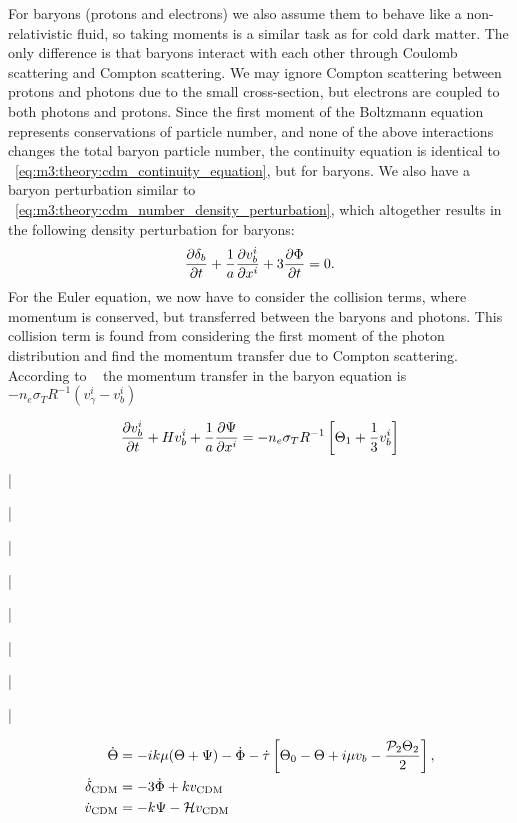     For baryons (protons and electrons) we also assume them to behave like a non-relativistic fluid, so taking moments is a similar task as for cold dark matter. The only difference is that baryons interact with each other through Coulomb scattering and Compton scattering. We may ignore Compton scattering between protons and photons due to the small cross-section, but electrons are coupled to both photons and protons. Since the first moment of the Boltzmann equation represents conservations of particle number, and none of the above interactions changes the total baryon particle number, the continuity equation is identical to ~\cref{eq:m3:theory:cdm_continuity_equation}, but for baryons. We also have a baryon perturbation similar to ~\cref{eq:m3:theory:cdm_number_density_perturbation}, which altogether results in the following density perturbation for baryons:
    \begin{equation}\label{eq:m3:theory:baryon_density_perturbation}
        \pdv{\delta_b}{t}+\frac{1}{a}\pdv{v_b^i}{x^i} + 3\pdv{\Phi}{t} = 0.
    \end{equation}
    For the Euler equation, we now have to consider the collision terms, where momentum is conserved, but transferred between the baryons and photons. This collision term is found from considering the first moment of the photon distribution and find the momentum transfer due to Compton scattering. According to ~\cite{AST5220LectureNotes} the momentum transfer in the baryon equation is $-n_e\sigma_TR^{-1}(v_\gamma^i-v_b^i)$


    
    \begin{equation}
        \pdv{v_b^i}{t}+Hv_b^i + \frac{1}{a}\pdv{\Psi}{x^i} = -n_e\sigma_TR^{-1}\left[\Theta_1+\frac{1}{3}v_b^i\right]
    \end{equation}

    |

    |
    
    |
    
    |
    
    |
    
    |
    
    |
    
    |

     
    \begin{subequations}
        \begin{align}
            \dot{\Theta} &= -ik\mu(\Theta+\Psi)-\dot{\Phi}-\dot{\tau}\left[\Theta_0-\Theta+i\mu v_b-\frac{\mathcal{P}_2\Theta_2}{2}\right],\\
            \dot{\delta}_{\text{CDM}} &= -3\dot{\Phi}+kv_{\text{CDM}} \\
            \dot{v}_{\text{CDM}} &= -k\Psi-\mathcal{H} v_{\text{CDM}} \\
        \end{align}
    \end{subequations}

